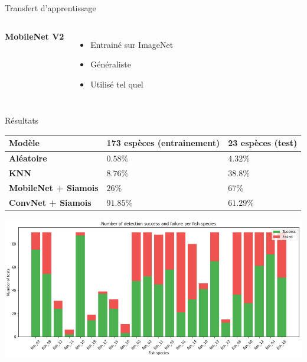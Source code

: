 \documentclass[10pt,xcolor={x11names}]{beamer}
\newcommand{\sectitle}[1]{{\large\color{titleblue}\textbf{#1}\\\smallskip}}
\begin{document}
\begin{frame}{Transfert d'apprentissage}
\begin{center}
\begin{columns}
			\sectitle{MobileNet V2}
			\begin{itemize}
				\item Entrainé sur ImageNet
				\item Généraliste
				\item Utilisé tel quel
			\end{itemize}
		\end{columns}
		
	\end{center}
\end{frame}

\begin{frame}{Résultats}
	\begin{tabular}{ |m{10em}|m{8em}|m{8em}| }
		\hline
		Modèle & \textbf{173 espèces (entrainement)} & \textbf{23 espèces (test)} \\
		\hline
		\textbf{Aléatoire} & $0.58\%$ & $4.32\%$ \\
		\textbf{KNN} & $8.76\%$ & $38.8\%$ \\
		\textbf{MobileNet + Siamois} & $26\%$ & $67\%$ \\
		\textbf{ConvNet + Siamois} & $91.85\%$ & $61.29\%$ \\
		\hline
	\end{tabular}
	\begin{center}
		\includegraphics[width=\linewidth]{tl1_23out.png}
	\end{center}
\end{frame}
\end{document}
